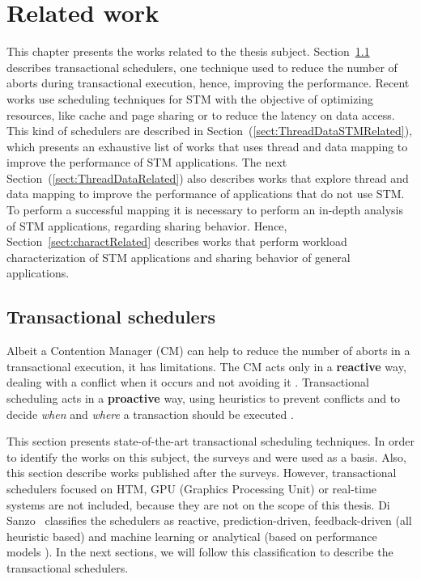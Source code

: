 \chapter{Related work}\label{chap:related}

This chapter presents the works related to the thesis subject. Section~\ref{sect:schedulers} describes transactional schedulers, one technique used to reduce the number of aborts during transactional execution, hence, improving the performance. Recent works use scheduling techniques for STM with the objective of optimizing resources, like cache and page sharing or to reduce the latency on data access. This kind of schedulers are described in Section~(\ref{sect:ThreadDataSTMRelated}), which presents an exhaustive list of works that uses thread and data mapping to improve the performance of STM applications. The next Section~(\ref{sect:ThreadDataRelated}) also describes works that explore thread and data mapping to improve the performance of applications that do not use STM. %
To perform a successful mapping it is necessary to perform an in-depth analysis of STM applications, regarding sharing behavior. Hence, Section~\ref{sect:charactRelated} describes works that perform workload characterization of STM applications and sharing behavior of general applications.

\section{Transactional schedulers}\label{sect:schedulers}

Albeit a Contention Manager (CM) can help to reduce the number of aborts in a transactional execution, it has limitations. The CM acts only in a \textbf{reactive} way, dealing with a conflict when it occurs and not avoiding it \cite{Yoo:2008, Shrink, Nicacio:2012}. Transactional scheduling acts in a \textbf{proactive} way, using heuristics to prevent conflicts and to decide \emph{when} and \emph{where} a transaction should be executed \cite{Shrink}. %

This section presents state-of-the-art transactional scheduling techniques. In order to identify the works on this subject, the surveys \cite{Hendler:2015} and \cite{Sanzo:2017} were used as a basis. Also, this section describe works published after the surveys. However, transactional schedulers focused on HTM, GPU (Graphics Processing Unit) or real-time systems are not included, because they are not on the scope of this thesis. Di Sanzo~\citeyearpar{Sanzo:2017} classifies the schedulers as reactive, prediction-driven, feedback-driven (all heuristic based) and machine learning or analytical (based on performance models \cite{Tay:2018}). In the next sections, we will follow this classification to describe the transactional schedulers.

